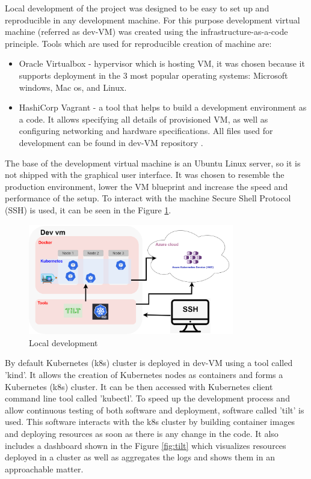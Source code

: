 Local development of the project was designed to be easy to set up and reproducible in any development machine. For this purpose development virtual machine (referred as dev-VM) was created using the infrastructure-as-a-code principle. Tools which are used for reproducible creation of machine are:
\begin{itemize}
    \item Oracle Virtualbox \cite{virtual_box} - hypervisor which is hosting VM, it was chosen because it supports deployment in the 3 most popular operating systems: Microsoft windows, Mac os, and Linux.
    \item HashiCorp Vagrant \cite{vagrant} - a tool that helps to build a development environment as a code. It allows specifying all details of provisioned VM, as well as configuring networking and hardware specifications. All files used for development can be found in dev-VM repository \cite{dev_vm}.
\end{itemize}

The base of the development virtual machine is an Ubuntu Linux server, so it is not shipped with the graphical user interface. It was chosen to resemble the production environment, lower the VM blueprint and increase the speed and performance of the setup. To interact with the machine Secure Shell Protocol (SSH) is used, it can be seen in the Figure \ref{fig:local_development}.

\begin{figure}[H]
    \centering
    \includegraphics[width=0.8\textwidth]{pictures/development_setup.png}
    \caption{Local development}
    \label{fig:local_development}
\end{figure}

By default Kubernetes (k8s) cluster is deployed in dev-VM using a tool called 'kind'. It allows the creation of Kubernetes nodes as containers and forms a Kubernetes (k8s) cluster. It can be then accessed with Kubernetes client command line tool called 'kubectl'. To speed up the development process and allow continuous testing of both software and deployment, software called 'tilt' is used. This software interacts with the k8s cluster by building container images and deploying resources as soon as there is any change in the code. It also includes a dashboard shown in the Figure \ref{fig:tilt} which visualizes resources deployed in a cluster as well as aggregates the logs and shows them in an approachable matter.


